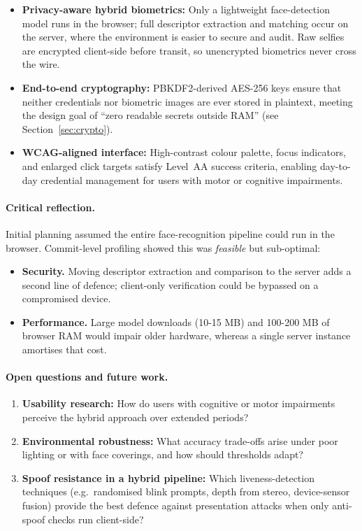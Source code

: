 \begin{itemize}
  \item \textbf{Privacy-aware hybrid biometrics:} Only a lightweight face-detection model runs in the browser; full descriptor extraction and matching occur on the server, where the environment is easier to secure and audit. Raw selfies are encrypted client-side before transit, so unencrypted biometrics never cross the wire.
  \item \textbf{End-to-end cryptography:} PBKDF2-derived AES-256 keys ensure that neither credentials nor biometric images are ever stored in plaintext, meeting the design goal of ``zero readable secrets outside RAM'' (see Section~\ref{sec:crypto}).
  \item \textbf{WCAG-aligned interface:} High-contrast colour palette, focus indicators, and enlarged click targets satisfy Level~AA success criteria, enabling day-to-day credential management for users with motor or cognitive impairments.
\end{itemize}

\paragraph{Critical reflection.}
Initial planning assumed the entire face-recognition pipeline could run in the browser. Commit-level profiling showed this was \emph{feasible} but sub-optimal:  
\begin{itemize}
  \item \textbf{Security.} Moving descriptor extraction and comparison to the server adds a second line of defence; client-only verification could be bypassed on a compromised device.
  \item \textbf{Performance.} Large model downloads (10-15 MB) and 100-200 MB of browser RAM would impair older hardware, whereas a single server instance amortises that cost.
\end{itemize}


\paragraph{Open questions and future work.}
\begin{enumerate}
  \item \textbf{Usability research:} How do users with cognitive or motor impairments perceive the hybrid approach over extended periods?
  \item \textbf{Environmental robustness:} What accuracy trade-offs arise under poor lighting or with face coverings, and how should thresholds adapt?
  \item \textbf{Spoof resistance in a hybrid pipeline:} Which liveness-detection techniques (e.g.\ randomised blink prompts, depth from stereo, device-sensor fusion) provide the best defence against presentation attacks when only anti-spoof checks run client-side?
\end{enumerate}

